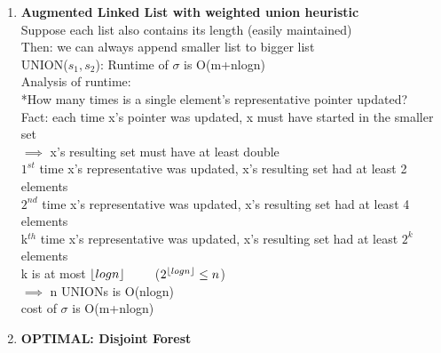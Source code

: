 \documentclass{article}
\DeclarePairedDelimiter\floor{\lfloor}{\rfloor}
\begin{document}
\begin{enumerate}
		\item \textbf{Augmented Linked List with weighted union heuristic}\\
		Suppose each list also contains its length (easily maintained)\\
		Then: we can always append smaller list to bigger list\\
		UNION($s_1,s_2$): Runtime of $\sigma$ is O(m+nlogn)\\
		Analysis of runtime:\\
		*How many times is a single element's representative pointer updated?\\
		Fact: each time x's pointer was updated, x must have started in the smaller set\\
		$\implies$ x's resulting set must have at least double\\
		$1^{st}$ time x's representative was updated, x's resulting set had at least 2 elements\\
		$2^{nd}$ time x's representative was updated, x's resulting set had at least 4 elements\\
		k$^{th}$ time x's representative was updated, x's resulting set had at least $2^k$ elements\\
		k is at most $\floor{log n}$ ~~~~($2^{\floor{log n}} \le n$)\\
		$\implies$ n UNIONs is O(nlogn)\\
		cost of $\sigma$ is O(m+nlogn)\\
		\item \textbf{OPTIMAL: Disjoint Forest}\\
	\end{enumerate}
	
\end{document}
